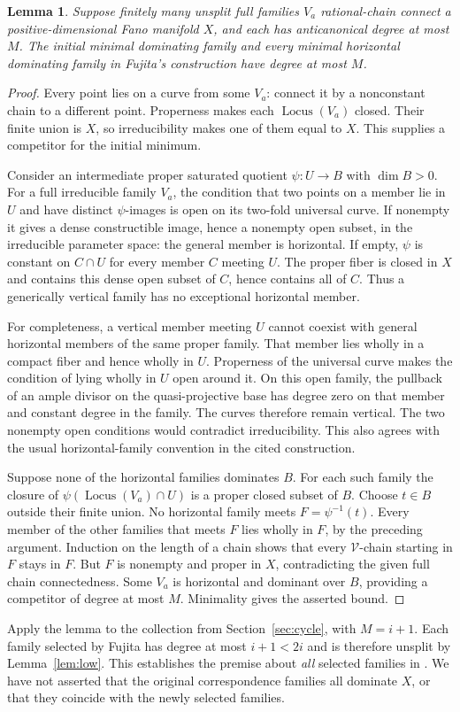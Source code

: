 \documentclass[11pt]{article}
\newtheorem{lemma}[theorem]{Lemma}
\theoremstyle{definition}\newtheorem{definition}[theorem]{Definition}
\theoremstyle{remark}\newtheorem{remark}[theorem]{Remark}
\newcommand{\Locus}{\operatorname{Locus}}
\begin{document}
\begin{lemma}\label{lem:horizontal}
Suppose finitely many unsplit full families $V_a$ rational-chain connect a
positive-dimensional Fano manifold $X$, and each has anticanonical degree
at most $M$. The initial minimal dominating family and every minimal
horizontal dominating family in Fujita's construction have degree at most
$M$.
\end{lemma}
\begin{proof}
Every point lies on a curve from some $V_a$: connect it by a nonconstant
chain to a different point. Properness makes each $\Locus(V_a)$ closed.
Their finite union is $X$, so irreducibility makes one of them equal to
$X$. This supplies a competitor for the initial minimum.

Consider an intermediate proper saturated quotient $\psi:U\to B$ with
$\dim B>0$. For a full irreducible family $V_a$, the condition that two
points on a member lie in $U$ and have distinct $\psi$-images is open on
its two-fold universal curve. If nonempty it gives a dense constructible
image, hence a nonempty open subset, in the irreducible parameter space:
the general member is horizontal. If empty, $\psi$ is constant on
$C\cap U$ for every member $C$ meeting $U$. The proper fiber is closed in
$X$ and contains this dense open subset of $C$, hence contains all of $C$.
Thus a generically vertical family has no exceptional horizontal member.

For completeness, a vertical member meeting $U$ cannot coexist with general
horizontal members of the same proper family. That member lies wholly in
a compact fiber and hence wholly in $U$. Properness of the universal curve
makes the condition of lying wholly in $U$ open around it. On this open
family, the pullback of an ample divisor on the quasi-projective base has
degree zero on that member and constant degree in the family. The curves
therefore remain vertical. The two nonempty open conditions would
contradict irreducibility. This also agrees with the usual horizontal-family
convention in the cited construction.

Suppose none of the horizontal families dominates $B$. For each such family
the closure of $\psi(\Locus(V_a)\cap U)$ is a proper closed subset of $B$.
Choose $t\in B$ outside their finite union. No horizontal family meets
$F=\psi^{-1}(t)$. Every member of the other families that meets $F$ lies
wholly in $F$, by the preceding argument. Induction on the length of a
chain shows that every $\mathcal V$-chain starting in $F$ stays in $F$.
But $F$ is nonempty and proper in $X$, contradicting the given full chain
connectedness. Some $V_a$ is horizontal and dominant over $B$, providing a
competitor of degree at most $M$. Minimality gives the asserted bound.
\end{proof}
Apply the lemma to the collection from Section~\ref{sec:cycle}, with
$M=i+1$. Each family selected by Fujita has degree at most $i+1<2i$ and is
therefore unsplit by Lemma~\ref{lem:low}. This establishes the premise about
\emph{all} selected families in \cite[Corollary 6.4]{fujita}. We have not
asserted that the original correspondence families all dominate $X$, or
that they coincide with the newly selected families.
\end{document}
